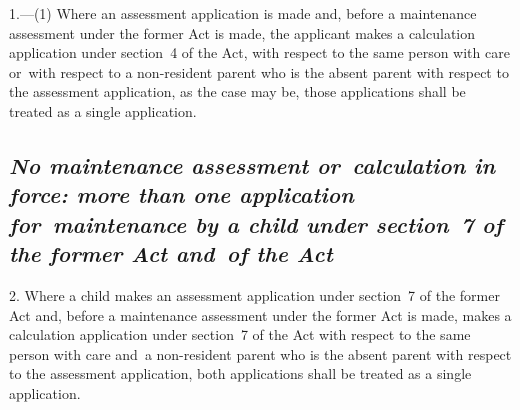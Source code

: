 \documentclass[12pt,a4paper]{article}
\begin{document}
1.---(1)  Where an assessment application is made and, before a maintenance assessment under the former Act is made, the applicant makes 
a calculation application under section~4 
of the Act, with respect to the same person with care or~with respect to a non-resident parent who is the absent parent with respect to the assessment application, as the case may be, those applications shall be treated as a single application.

%
%


\subsection*{\itshape No maintenance assessment or~calculation in force: more than one application for~maintenance by a child under section~7 of the former Act and~of the Act}

2.  Where a child makes an assessment application under section~7 of the former Act and, before a maintenance assessment under the former Act is made, makes a calculation application under section~7 of the Act with respect to the same person with care and~a non-resident parent who is the absent parent with respect to the assessment application, both applications shall be treated as a single application.
\end{document}
